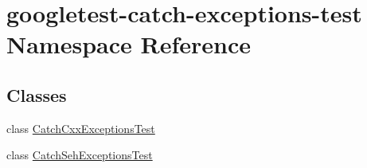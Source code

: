 \hypertarget{namespacegoogletest-catch-exceptions-test}{}\section{googletest-\/catch-\/exceptions-\/test Namespace Reference}
\label{namespacegoogletest-catch-exceptions-test}
\subsection*{Classes}
\begin{DoxyCompactItemize}
\item 
class \mbox{\hyperlink{classgoogletest-catch-exceptions-test_1_1_catch_cxx_exceptions_test}{Catch\+Cxx\+Exceptions\+Test}}
\item 
class \mbox{\hyperlink{classgoogletest-catch-exceptions-test_1_1_catch_seh_exceptions_test}{Catch\+Seh\+Exceptions\+Test}}
\end{DoxyCompactItemize}
